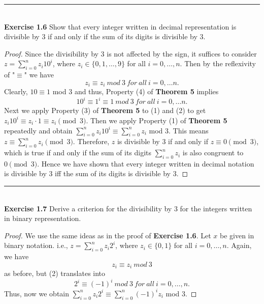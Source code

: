 \documentclass[a4paper]{article}
\begin{document}
\noindent\rule{12cm}{0.4pt}\\
\noindent \textbf{Exercise 1.6} Show that every integer written in decimal representation is divisible by $3$ if and only if the sum of its digits is divisible by $3$.
\begin{proof}
Since the divisibility by 3 is not affected by the sign, it suffices to consider $z= \sum_{i=0}^{n}{z_{i}10^{i}}$, where $z_{i} \in \{0,1,\ldots,9\}$ for all $i = 0, \ldots, n$. Then by the reflexivity of "$\equiv$" we have
\begin{equation}
z_{i} \equiv z_{i}\ mod\ 3\ for\ all\ i = 0, \ldots n.
\end{equation}
Clearly, $10 \equiv 1$ mod $3$ and thus, Property (4) of \textbf{Theorem 5} implies
\begin{equation}
10^{i} \equiv 1^{i} \equiv 1\ mod\ 3\ for\ all\ i = 0, \ldots n.
\end{equation}
Next we apply Property (3) of \textbf{Theorem 5} to (1) and (2) to get $z_i 10^i \equiv z_i \cdot 1 \equiv z_i \pmod 3$. Then we apply Property (1) of \textbf{Theorem 5} repeatedly and obtain $\sum_{i=0}^{n}{z_{i}10^{i}} \equiv \sum_{i=0}^{n}{z_{i}}$ mod $3$. This means $z \equiv \sum_{i=0}^{n} z_i \pmod 3$. Therefore, $z$ is divisible by $3$ if and only if $z \equiv 0 \pmod 3$, which is true if and only if the sum of its digits $\sum_{i=0}^{n} z_i$ is also congruent to $0 \pmod 3$. Hence we have shown that every integer written in decimal notation is divisible by $3$ iff the sum of its digits is divisible by $3$. 
\end{proof}



\noindent\rule{12cm}{0.4pt}\\
\noindent \textbf{Exercise 1.7} Derive a criterion for the divisibility by $3$ for the integers written in binary representation.
\begin{proof}
We use the same ideas as in the proof of \textbf{Exercise 1.6}. Let $x$ be given in binary notation. i.e., $z=\sum_{i=0}^{n}{z_{i}2^{i}}$, where $z_{i} \in \{ 0,1 \}$ for all $i = 0, \ldots, n$. Again, we have
\begin{equation}
z_{i} \equiv z_{i}\ mod\ 3
\end{equation}
as before, but (2) translates into
\begin{equation}
2^{i} \equiv (-1)^{i}\ mod\ 3\ for\ all\ i=0, \ldots, n.
\end{equation}
Thus, now we obtain $\sum_{i=0}^{n}{z_{i}2^{i}} \equiv \sum_{i=0}^{n}{(-1)^{i}z_{i}}$ mod $3$.
\end{proof}
\end{document}
